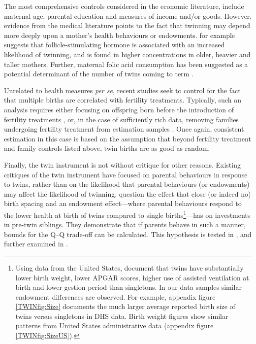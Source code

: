 \documentclass[subeqn]{article}
\begin{document}
\begin{spacing}{1.4}
The most comprehensive controls considered in the economic literature, include
maternal age, parental education and measures of income and/or goods.  However,
evidence from the medical literature points to the fact that twinning may
depend more deeply upon a mother's health behaviours or endowments. \citet{Hall2003}
for example suggests that follicle-stimulating hormone is associated with
an increased likelihood of twinning, and is found in higher concentrations in
older, heavier and taller mothers. Further, maternal folic acid consumption
has been suggested as a potential determinant of the number of twins coming to
term \citet{Lietal2003}.

Unrelated to health measures \emph{per se}, recent studies seek to control for 
the fact that multiple births are correlated with fertility treatments. 
Typically, such an analysis requires either focusing on offspring born before
the introduction of fertility treatments \citep{Caceres2006,Angristetal2010}, 
or, in the case of sufficiently rich data, removing families undergoing fertility 
treatment from estimation samples \citep{Braakman2014}. Once again, consistent 
estimation in this case is based on the assumption that beyond fertility 
treatment and family controls listed above, twin births are as good as random.

Finally, the twin instrument is not without critique for other reasons. Existing
critiques of the twin instrument have focused on parental behaviours in response 
to twins, rather than on the likelihood that parental behaviours (or endowments) 
may affect the likelihood of twinning. \citet{RosenzweigZhang2009} question the 
effect that close (or indeed no) birth spacing and an endowment effect---where 
parental behaviours respond to the lower health at birth of twins compared to 
single births\footnote{Using data from the United States, \citet{Almondetal2005} 
document that twins have substantially lower birth weight, lower APGAR scores, 
higher use of assisted ventilation at birth and lower gestion period than 
singletons. In our data samples similar endowment differences are observed. For
example, appendix figure \ref{TWINfig:Size} documents the much larger average 
reported birth size of twins versus singletons in DHS data. Birth weight figures 
show similar patterns from United States administrative data (appendix figure
\ref{TWINfig:SizeUS}).}---has on investments in pre-twin siblings. They 
demonstrate that if parents behave in such a manner, bounds for the Q--Q 
trade-off can be calculated. This hypothesis is tested in 
\citet{Angristetal2010}, and further examined in \citet{FitzsimonsMalde2014}. 


\end{spacing}
\end{document}
